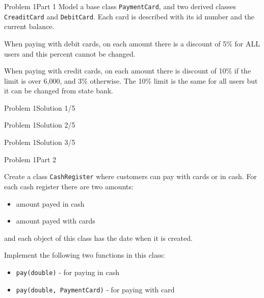 
\begin{frame}{Problem 1}{Part 1}
Model a base class \texttt{PaymentCard}, and two derived classes
\texttt{CreaditCard} and \texttt{DebitCard}. Each card is described with its id
number and the current balance.

When paying with debit cards, on each amount there is a discount of 5\% for ALL
users and this percent cannot be changed.

When paying with credit cards, on each amount there is discount of 10\% if the
limit is over 6,000, and 3\% otherwise. The 10\% limit is the same for all users
but it can be changed from state bank.

\end{frame}

\begin{frame}[fragile]{Problem 1}{Solution 1/5}

\end{frame}

\begin{frame}[fragile]{Problem 1}{Solution 2/5}

\end{frame}

\begin{frame}[fragile]{Problem 1}{Solution 3/5}

\end{frame}

\begin{frame}{Problem 1}{Part 2}

Create a class \texttt{CashRegister} where customers can pay with cards or in
cash. For each cash register there are two amounts:

\begin{itemize}
  \item amount payed in cash
  \item amount payed with cards
\end{itemize}

and each object of this class has the date when it is created.

Implement the following two functions in this class:

\begin{itemize}
  \item \texttt{pay(double)} - for paying in cash
  \item \texttt{pay(double, PaymentCard)} - for paying with card
\end{itemize}

\end{frame}

